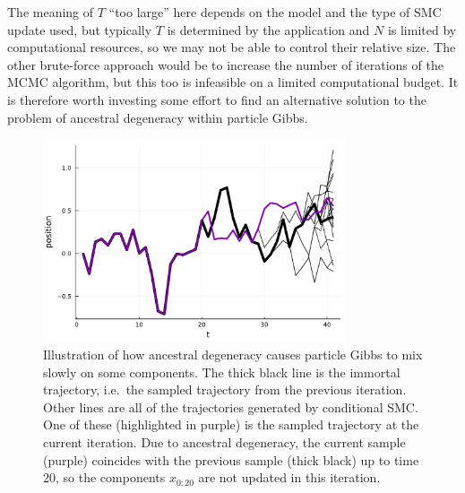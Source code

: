 The meaning of $T$ ``too large'' here depends on the model and the type of SMC update used, but typically $T$ is determined by the application and $N$ is limited by computational resources, so we may not be able to control their relative size. The other brute-force approach would be to increase the number of iterations of the MCMC algorithm, but this too is infeasible on a limited computational budget.
It is therefore worth investing some effort to find an alternative solution to the problem of ancestral degeneracy within particle Gibbs.

\begin{figure}
\centering
\includegraphics[width=0.8\textwidth]{plots/PG_degen.pdf}
\caption[Ancestral degeneracy in particle Gibbs]{Illustration of how ancestral degeneracy causes particle Gibbs to mix slowly on some components. The thick black line is the immortal trajectory, i.e.\ the sampled trajectory from the previous iteration. Other lines are all of the trajectories generated by conditional SMC. One of these (highlighted in purple) is the sampled trajectory at the current iteration. Due to ancestral degeneracy, the current sample (purple) coincides with the previous sample (thick black) up to time 20, so the components $x_{0:20}$ are not updated in this iteration.}
\label{fig:PG_ancdegen}
\end{figure}





